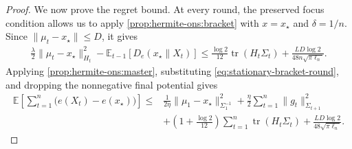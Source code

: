 \documentclass{article}
\theoremstyle{plain}
\theoremstyle{definition}
\theoremstyle{plain}
\newcommand{\tr}{\operatorname{tr}}
\newcommand{\E}{\mathbb E}
\begin{document}
\begin{proof}
    We now prove the regret bound. At every round, the preserved focus
    condition allows us to apply
    \cref{prop:hermite-ons:bracket} with
    $x=x_\star$ and $\delta=1/n$. Since
    $\|\mu_t-x_\star\|\leq D$, it gives
    \begin{align}
        \frac{\lambda}{2}
        \|\mu_t-x_\star\|_{H_t}^2
        -
        \E_{t-1}[D_e(x_\star\|X_t)]
        \leq
        \frac{\log2}{12}\tr(H_t\Sigma_t)
        +
        \frac{LD\log2}
        {48n\sqrt{\pi\ell_n}}.
        \label{eq:stationary-bracket-round}
    \end{align}
    Applying \cref{prop:hermite-ons:master}, substituting
    \eqref{eq:stationary-bracket-round}, and dropping the nonnegative
    final potential gives
    \begin{align}
        \E\left[
            \sum_{t=1}^n
            \bigl(e(X_t)-e(x_\star)\bigr)
            \right]
        \leq{} &
        \frac{1}{2\eta}
        \|\mu_1-x_\star\|_{\Sigma_1^{-1}}^2
        +
        \frac{\eta}{2}
        \sum_{t=1}^n
        \|g_t\|_{\Sigma_{t+1}}^2
        \nonumber  \\
               & +
        \left(
        1+\frac{\log2}{12}
        \right)
        \sum_{t=1}^n
        \tr(H_t\Sigma_t)
        +
        \frac{LD\log2}
        {48\sqrt{\pi\ell_n}}.
        \label{eq:stationary-regret-decomposition}
    \end{align}


\end{proof}
\end{document}
